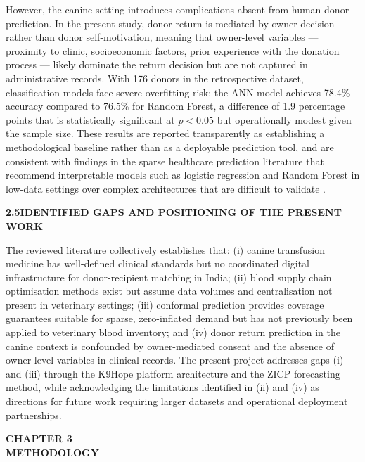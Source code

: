 \documentclass[12pt,a4paper]{article}
\begin{document}
\noindent However, the canine setting introduces complications absent from human donor prediction. In the present study, donor return is mediated by owner decision rather than donor self-motivation, meaning that owner-level variables — proximity to clinic, socioeconomic factors, prior experience with the donation process — likely dominate the return decision but are not captured in administrative records. With 176 donors in the retrospective dataset, classification models face severe overfitting risk; the ANN model achieves 78.4\% accuracy compared to 76.5\% for Random Forest, a difference of 1.9 percentage points that is statistically significant at $p < 0.05$ but operationally modest given the sample size. These results are reported transparently as establishing a methodological baseline rather than as a deployable prediction tool, and are consistent with findings in the sparse healthcare prediction literature that recommend interpretable models such as logistic regression and Random Forest in low-data settings over complex architectures that are difficult to validate \cite{chawla2002}.

\vspace{1.5em}
\noindent\textbf{2.5\quad IDENTIFIED GAPS AND POSITIONING OF THE PRESENT WORK}
\vspace{0.6em}

\noindent The reviewed literature collectively establishes that: (i) canine transfusion medicine has well-defined clinical standards but no coordinated digital infrastructure for donor-recipient matching in India; (ii) blood supply chain optimisation methods exist but assume data volumes and centralisation not present in veterinary settings; (iii) conformal prediction provides coverage guarantees suitable for sparse, zero-inflated demand but has not previously been applied to veterinary blood inventory; and (iv) donor return prediction in the canine context is confounded by owner-mediated consent and the absence of owner-level variables in clinical records. The present project addresses gaps (i) and (iii) through the K9Hope platform architecture and the ZICP forecasting method, while acknowledging the limitations identified in (ii) and (iv) as directions for future work requiring larger datasets and operational deployment partnerships.

\newpage
\begin{center}
    \textbf{\large CHAPTER 3}\\[0.4em]
    \textbf{\large METHODOLOGY}
\end{center}
\vspace{1.5em}
\end{document}
